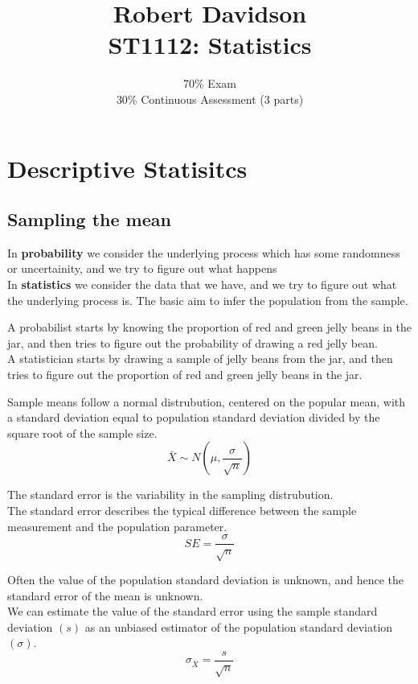 \documentclass[a4paper, 10pt]{article}
\title{
Robert Davidson \\
\textbf{ST1112: Statistics}
}
\author{
70\% Exam\\
30\% Continuous Assessment (3 parts)
}
\date{}       %
\begin{document}
\maketitle
\pagebreak



\tableofcontents
\pagebreak
\section{Descriptive Statisitcs}
\subsection{Sampling the mean}
In \textbf{probability} we consider the underlying process which has some randomness or uncertainity, and we try to figure out what happens \\[2ex]
In \textbf{statistics} we consider the data that we have, and we try to figure out what the underlying process is. The basic aim to infer the population from the sample.
\begin{examplebox}
    A probabilist starts by knowing the proportion of red and green jelly beans in the jar, and then tries to figure out the probability of drawing a red jelly bean.\\
    A statistician starts by drawing a sample of jelly beans from the jar, and then tries to figure out the proportion of red and green jelly beans in the jar.
\end{examplebox}

\begin{definitionbox}
    Sample means follow a normal distrubution, centered on the popular mean, with a standard deviation equal to population standard deviation divided by the square root of the sample size.
    $$\bar{X} \sim N \left(\mu, \frac{\sigma}{\sqrt{n}}\right)$$
\end{definitionbox}

\begin{definitionbox}
    The standard error is the variability in the sampling distrubution. \\
    The standard error describes the typical difference between the sample measurement and the population parameter.
    $$SE = \frac{\sigma}{\sqrt{n}}$$
\end{definitionbox}
\begin{definitionbox}
    Often the value of the population standard deviation is unknown, and hence the standard error of the mean is unknown. \\
    We can estimate the value of the standard error using the sample standard deviation $(s)$ as an unbiased estimator of the population standard deviation $(\sigma)$.
    $$\sigma_{\bar{X}} = \frac{s}{\sqrt{n}}$$
\end{definitionbox}
\end{document}
